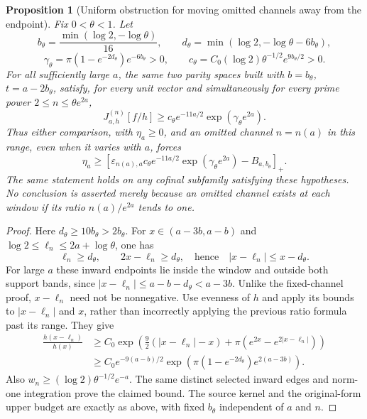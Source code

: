 \documentclass[11pt]{article}
\newtheorem{proposition}[theorem]{Proposition}
\theoremstyle{remark}
\begin{document}
\begin{proposition}[Uniform obstruction for moving omitted channels away from the endpoint]
\label{prop:ns43-moving-channel}
Fix $0<\theta<1$. Let
\[
 b_\theta=\frac{\min(\log2,-\log\theta)}{16},\qquad
 d_\theta=\min(\log2,-\log\theta-6b_\theta),
\]
\[
 \gamma_\theta=\pi(1-e^{-2d_\theta})e^{-6b_\theta}>0,
 \qquad c_\theta=C_0(\log2)\theta^{-1/2}e^{9b_\theta/2}>0.
\]
For all sufficiently large $a$, the same two parity spaces built with
$b=b_\theta$, $t=a-2b_\theta$, satisfy, for every unit vector and
\emph{simultaneously for every prime power} $2\le n\le\theta e^{2a}$,
\[
 J^{(n)}_{a,h}[f/h]\ge
 c_\theta e^{-11a/2}\exp(\gamma_\theta e^{2a}).
\]
Thus either comparison, with $\eta_a\ge0$, and an omitted channel
$n=n(a)$ in this range, even when it varies with $a$, forces
\[
 \eta_a\ge
 [\varepsilon_{n(a),a}c_\theta e^{-11a/2}
             \exp(\gamma_\theta e^{2a})-B_{a,b_\theta}]_+.
\]
The same statement holds on any cofinal subfamily satisfying these
hypotheses. No conclusion is asserted merely because an omitted
channel exists at each window if its ratio $n(a)/e^{2a}$ tends to one.
\end{proposition}
\begin{proof}
Here $d_\theta\ge10b_\theta>2b_\theta$. For $x\in(a-3b,a-b)$ and
$\log2\le\ell_n\le2a+\log\theta$, one has
\[
 \ell_n\ge d_\theta,\qquad 2x-\ell_n\ge d_\theta,
 \quad\text{hence}\quad |x-\ell_n|\le x-d_\theta.
\]
For large $a$ these inward endpoints lie inside the window and outside
both support bands, since
$|x-\ell_n|\le a-b-d_\theta<a-3b$. Unlike the fixed-channel proof,
$x-\ell_n$ need not be nonnegative. Use evenness of $h$ and apply its
bounds to $|x-\ell_n|$ and $x$, rather than incorrectly applying the
previous ratio formula past its range. They give
\begin{align*}
 \frac{h(x-\ell_n)}{h(x)}
 &\ge C_0\exp\!\left(\tfrac92(|x-\ell_n|-x)
                   +\pi(e^{2x}-e^{2|x-\ell_n|})\right)\\
 &\ge C_0e^{-9(a-b)/2}
                \exp\!\left(\pi(1-e^{-2d_\theta})e^{2(a-3b)}\right).
\end{align*}
Also $w_n\ge(\log2)\theta^{-1/2}e^{-a}$. The same distinct selected
inward edges and norm-one integration prove the claimed bound. The
source kernel and the original-form upper budget are exactly as above,
with fixed $b_\theta$ independent of $a$ and $n$.
\end{proof}
\end{document}
